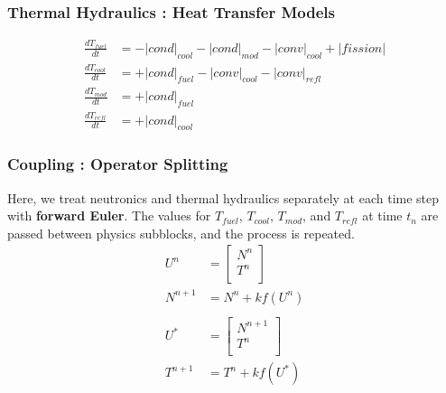 \begin{frame}[fragile]
  \frametitle{Thermal Hydraulics : Heat Transfer Models }
\footnotesize{
  \begin{align} 
    \frac{dT_{fuel}}{dt} &=  - |cond|_{cool} - |cond|_{mod} - |conv|_{cool} + |fission|\\
    \frac{dT_{cool}}{dt} &=  + |cond|_{fuel} - |conv|_{cool} - |conv|_{refl} \\
    \frac{dT_{mod}}{dt}  &=  + |cond|_{fuel}\\
    \frac{dT_{refl}}{dt} &=  + |cond|_{cool}
  \end{align}
}
\end{frame}

\begin{frame}[fragile]
  \frametitle{Coupling : Operator Splitting}
  Here, we treat neutronics and thermal hydraulics separately at 
  each time step with \textbf{forward Euler}. The values for $T_{fuel}$, 
  $T_{cool}$, $T_{mod}$, and $T_{refl}$ at time $t_n$ 
  are passed between physics subblocks, and the process is repeated.
  \footnotesize{
  \begin{align} 
    U^n &= \left[
                  \begin{array}{ c }
                    N^n\\
                    T^n\\
                  \end{array}
                  \right]\\
    N^{n+1} &= N^n + kf(U^n)\\
    \nonumber\\
    U^* &= \left[
                  \begin{array}{ c }
                    N^{n+1}\\
                    T^n\\
                  \end{array}
                  \right]\\
    T^{n+1} &= T^n + kf(U^*)
  \end{align}
  }
\end{frame}

